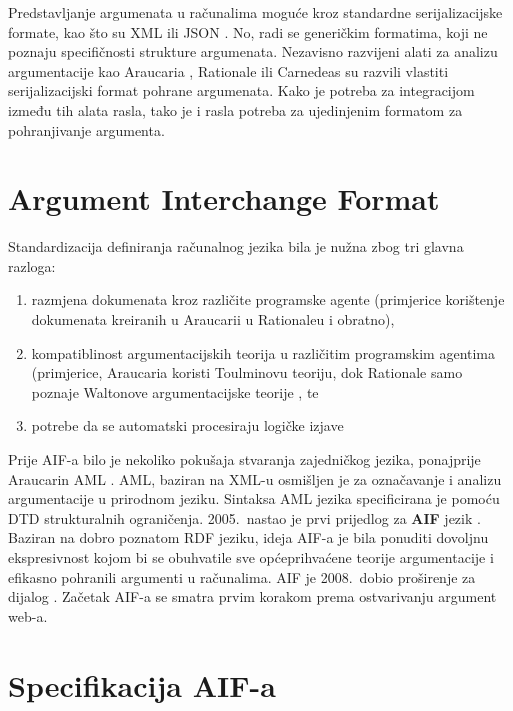 Predstavljanje argumenata u računalima moguće kroz standardne 
serijalizacijske formate, kao što su
XML  ili JSON . 
No, radi se generičkim formatima, koji ne poznaju specifičnosti 
strukture argumenata. Nezavisno razvijeni alati 
za analizu argumentacije kao Araucaria \citep{reed2004araucaria},
Rationale \citep{van2007rationale}
ili Carnedeas \citep{gordon2006carneades}
su razvili vlastiti serijalizacijski format pohrane
argumenata. Kako je potreba za integracijom između tih alata rasla, tako
je i rasla potreba za ujedinjenim formatom za pohranjivanje argumenta. 

\section{Argument Interchange Format}

Standardizacija definiranja računalnog jezika bila je nužna zbog tri glavna razloga:
\begin{enumerate}
    \item razmjena dokumenata kroz različite programske agente (primjerice 
korištenje dokumenata kreiranih u Araucarii u Rationaleu i obratno), 
    \item kompatiblinost argumentacijskih teorija u različitim programskim agentima
(primjerice, Araucaria koristi Toulminovu teoriju, dok Rationale samo poznaje 
Waltonove argumentacijske teorije \citep{walton2012argument}, te 
    \item potrebe da se automatski procesiraju logičke izjave
\end{enumerate}

Prije AIF-a bilo je nekoliko pokušaja stvaranja zajedničkog jezika, ponajprije
Araucarin AML . AML, baziran na XML-u
 osmišljen je za označavanje i analizu
argumentacije u prirodnom jeziku. Sintaksa AML jezika specificirana je pomoću
DTD  strukturalnih ograničenja.  
2005.\ nastao je prvi prijedlog za \textbf{AIF}  jezik \citep{chesnevar2006towards}. 
Baziran na dobro poznatom RDF jeziku, ideja AIF-a
je bila ponuditi dovoljnu ekspresivnost kojom bi se obuhvatile sve
općeprihvaćene teorije argumentacije i efikasno pohranili 
argumenti u računalima. 
AIF je 2008.\ dobio proširenje za dijalog \citep{reed2008aif+}.
Začetak AIF-a se smatra prvim korakom
prema ostvarivanju argument web-a. 


\section{Specifikacija AIF-a}

